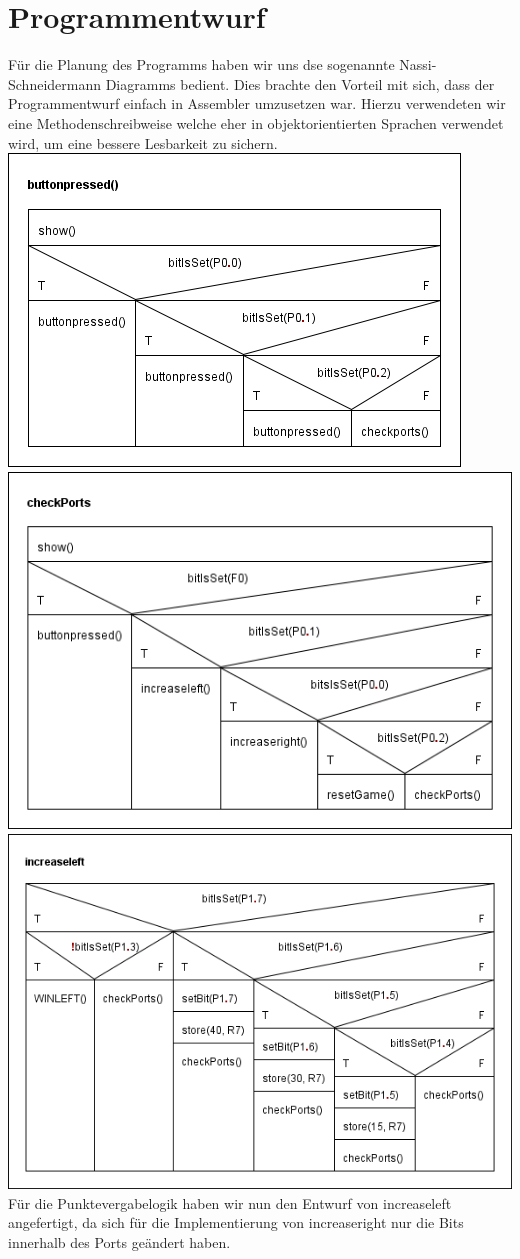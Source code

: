 \section{Programmentwurf}
Für die Planung des Programms haben wir uns dse sogenannte Nassi-Schneidermann Diagramms bedient. Dies brachte den Vorteil mit sich, dass der Programmentwurf einfach in Assembler umzusetzen war. Hierzu verwendeten wir eine Methodenschreibweise welche eher in objektorientierten Sprachen verwendet wird, um eine bessere Lesbarkeit zu sichern.
\includegraphics{img/buttonpressed}
\includegraphics{img/checkPorts}
\includegraphics{img/increaseleft}
Für die Punktevergabelogik haben wir nun den Entwurf von increaseleft angefertigt, da sich für die Implementierung von increaseright nur die Bits innerhalb des Ports geändert haben. 